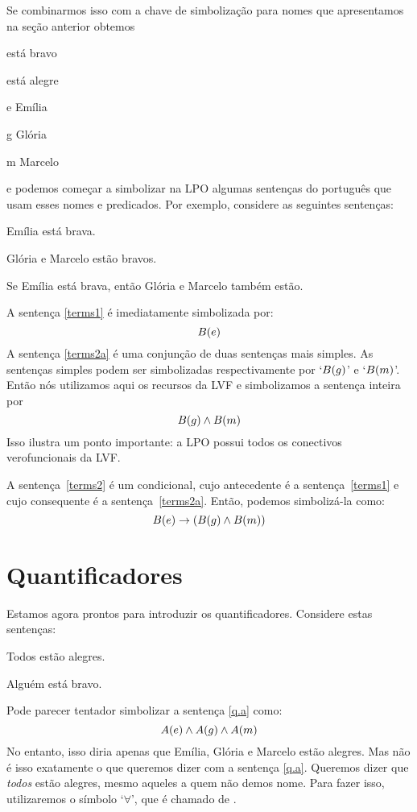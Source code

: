 Se combinarmos isso com a chave de simbolização para nomes que apresentamos na seção anterior obtemos
	\begin{ekey}
		\item[\atom{B}{x}]  está bravo
		\item[\atom{A}{x}]  está alegre
		\item[e] Emília
		\item[g] Glória
		\item[m] Marcelo
	\end{ekey}
e podemos começar a simbolizar na LPO algumas sentenças do português que usam esses nomes e predicados.
Por exemplo, considere as seguintes sentenças:
	\begin{earg}
		\item[\ex{terms1}] Emília está brava.
		\item[\ex{terms2a}] Glória e Marcelo estão bravos.
		\item[\ex{terms2}] Se Emília está brava, então Glória e Marcelo também estão.
	\end{earg}

A sentença \ref{terms1} é imediatamente simbolizada por:
$$\mathord{B}(e)$$
A sentença \ref{terms2a} é uma conjunção de duas sentenças mais simples.
As sentenças simples podem ser simbolizadas respectivamente por `$\mathord{B}(g)$' e `$\mathord{B}(m)$'.
Então nós utilizamos aqui os recursos da LVF e simbolizamos a sentença inteira por
$$\mathord{B}(g) \wedge \mathord{B}(m)$$
Isso ilustra um ponto importante:
a LPO possui todos os conectivos verofuncionais da LVF.

A sentença~\ref{terms2} é um condicional, cujo antecedente é a sentença~\ref{terms1} e cujo consequente é a sentença~\ref{terms2a}.
Então, podemos simbolizá-la como:
$$\mathord{B}(e) \rightarrow (\mathord{B}(g) \wedge \mathord{B}(m))$$


\section{Quantificadores}
Estamos agora prontos para introduzir os quantificadores.
Considere estas sentenças:
	\begin{earg}
		\item[\ex{q.a}] Todos estão alegres.
		\item[\ex{q.e}] Alguém está bravo.
	\end{earg}
Pode parecer tentador simbolizar a sentença \ref{q.a} como:
$$\mathord{A}(e) \wedge \mathord{A}(g) \wedge \mathord{A}(m)$$
No entanto, isso diria apenas que Emília, Glória e Marcelo estão alegres.
Mas não é isso exatamente o que queremos dizer com a sentença \ref{q.a}.
Queremos dizer que \emph{todos} estão alegres, mesmo aqueles a quem não demos nome.
Para fazer isso, utilizaremos o símbolo `$\forall$', que é chamado de .

